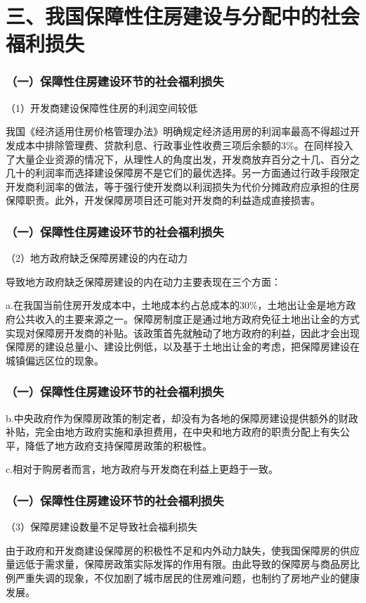\documentclass[aspectratio=169, 12pt]{beamer}
\begin{document}
\section{三、我国保障性住房建设与分配中的社会福利损失}

\begin{frame}[plain]
    \frametitle{（一）保障性住房建设环节的社会福利损失}
    （1）开发商建设保障性住房的利润空间较低 \par
    我国《经济适用住房价格管理办法》明确规定经济适用房的利润率最高不得超过开发成本中排除管理费、贷款利息、行政事业性收费三项后余额的3\%。在同样投入了大量企业资源的情况下，从理性人的角度出发，开发商放弃百分之十几、百分之几十的利润率而选择建设保障房不是它们的最优选择。另一方面通过行政手段限定开发商利润率的做法，等于强行使开发商以利润损失为代价分摊政府应承担的住房保障职责。此外，开发保障房项目还可能对开发商的利益造成直接损害。
\end{frame}

\begin{frame}[plain]
    \frametitle{（一）保障性住房建设环节的社会福利损失}
    （2）地方政府缺乏保障房建设的内在动力\par
         导致地方政府缺乏保障房建设的内在动力主要表现在三个方面：\par
         a.在我国当前住房开发成本中，土地成本约占总成本的30\%，土地出让金是地方政府公共收入的主要来源之一。保障房制度正是通过地方政府免征土地出让金的方式实现对保障房开发商的补贴。该政策首先就触动了地方政府的利益，因此才会出现保障房的建设总量小、建设比例低，以及基于土地出让金的考虑，把保障房建设在城镇偏远区位的现象。
\end{frame}

\begin{frame}[plain]
    \frametitle{（一）保障性住房建设环节的社会福利损失}
    b.中央政府作为保障房政策的制定者，却没有为各地的保障房建设提供额外的财政补贴，完全由地方政府实施和承担费用，在中央和地方政府的职责分配上有失公平，降低了地方政府支持保障房政策的积极性。
    \par
    c.相对于购房者而言，地方政府与开发商在利益上更趋于一致。
\end{frame}

\begin{frame}[plain]
    \frametitle{（一）保障性住房建设环节的社会福利损失}
    （3）保障房建设数量不足导致社会福利损失\par
       由于政府和开发商建设保障房的积极性不足和内外动力缺失，使我国保障房的供应量远低于需求量，保障房政策实际发挥的作用有限。由此导致的保障房与商品房比例严重失调的现象，不仅加剧了城市居民的住房难问题，也制约了房地产业的健康发展。
\end{frame}
\end{document}
